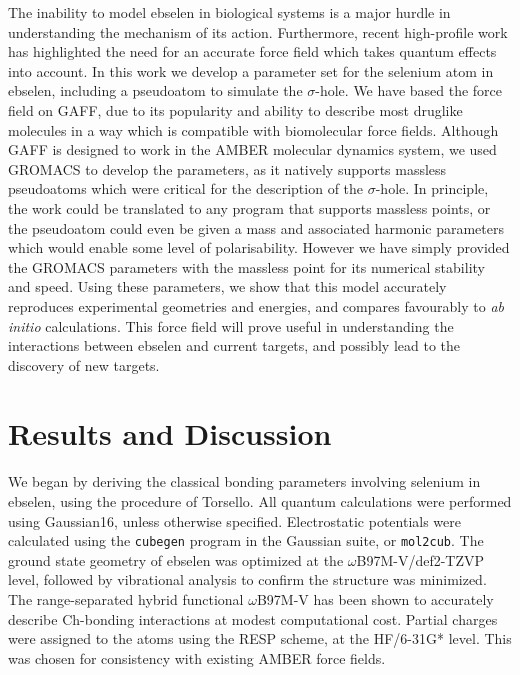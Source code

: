 \begin{refsection}
The inability to model ebselen in biological systems is a major hurdle in understanding the mechanism of its action.
Furthermore, recent high-profile work has highlighted the need for an accurate force field which takes quantum effects into account.\autocite{Weglarz-Tomczak2021,Menendez2020}
In this work we develop a parameter set for the selenium atom in ebselen, including a pseudoatom to simulate the $\sigma$-hole.
We have based the force field on GAFF, due to its popularity and ability to describe most druglike molecules in a way which is compatible with biomolecular force fields.
Although GAFF is designed to work in the AMBER molecular dynamics system, we used GROMACS to develop the parameters, as it natively supports massless pseudoatoms which were critical for the description of the $\sigma$-hole.
In principle, the work could be translated to any program that supports massless points, or the pseudoatom could even be given a mass and associated harmonic parameters which would enable some level of polarisability.
However we have simply provided the GROMACS parameters with the massless point for its numerical stability and speed.
Using these parameters, we show that this model accurately reproduces experimental geometries and energies, and compares favourably to \emph{ab initio} calculations.
This force field will prove useful in understanding the interactions between ebselen and current targets, and possibly lead to the discovery of new targets.

\section{Results and Discussion}
We began by deriving the classical bonding parameters involving selenium in ebselen, using the procedure of Torsello.\autocite{Torsello2016}
All quantum calculations were performed using Gaussian16, unless otherwise specified.\autocite{gaussian16}
Electrostatic potentials were calculated using the \texttt{cubegen} program in the Gaussian suite, or \texttt{mol2cub}.\autocite{mol2cub}
The ground state geometry of ebselen was optimized at the $\omega$B97M-V/def2-TZVP level, followed by vibrational analysis to confirm the structure was minimized.\autocite{Chai2008,Weigend2005,Weigend2006}
The range-separated hybrid functional $\omega$B97M-V has been shown to accurately describe Ch-bonding interactions at modest computational cost.\autocite{Mehta2021}
Partial charges were assigned to the atoms using the RESP scheme, at the HF/6-31G* level.\autocite{Cornell1993}
This was chosen for consistency with existing AMBER force fields.


\end{refsection}
